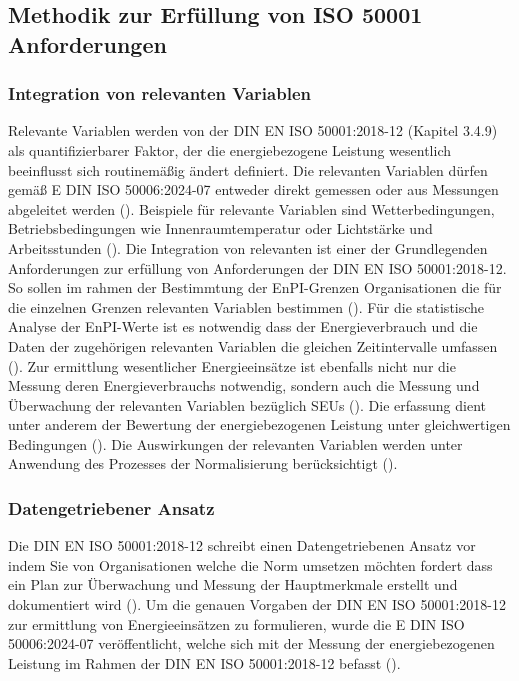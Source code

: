 \subsection{Methodik zur Erfüllung von ISO 50001 Anforderungen}

\subsubsection{Integration von relevanten Variablen}
Relevante Variablen werden von der DIN EN ISO 50001:2018-12 (Kapitel 3.4.9) als quantifizierbarer Faktor, der die energiebezogene Leistung wesentlich beeinflusst sich 
routinemäßig ändert definiert. 
Die relevanten Variablen dürfen gemäß E DIN ISO 50006:2024-07 entweder direkt gemessen oder aus Messungen abgeleitet werden (\cite[S. 18]{DIN50006.2024}).
Beispiele für relevante Variablen sind Wetterbedingungen, Betriebsbedingungen wie Innenraumtemperatur oder Lichtstärke und Arbeitsstunden (\cite[Kapitel 3.4.9]{DIN50001.2018}).
Die Integration von relevanten ist einer der Grundlegenden Anforderungen zur erfüllung von Anforderungen der DIN EN ISO 50001:2018-12.
So sollen im rahmen der Bestimmtung der EnPI-Grenzen Organisationen die für die einzelnen Grenzen relevanten Variablen bestimmen (\cite[S. 17]{DIN50006.2024}).
Für die statistische Analyse der EnPI-Werte ist es notwendig dass der Energieverbrauch und die Daten der zugehörigen relevanten Variablen 
die gleichen Zeitintervalle umfassen (\cite[S. 20]{DIN50006.2024}).
Zur ermittlung wesentlicher Energieeinsätze ist ebenfalls nicht nur die Messung deren Energieverbrauchs notwendig, sondern auch die Messung und Überwachung der 
relevanten Variablen bezüglich SEUs (\cite[S. 23]{DIN50001.2018}). 
Die erfassung dient unter anderem der Bewertung der energiebezogenen Leistung unter gleichwertigen Bedingungen (\cite[S. 8]{DIN50006.2024}). 
Die Auswirkungen der relevanten Variablen werden unter Anwendung des Prozesses der Normalisierung berücksichtigt (\cite[S. 8]{DIN50006.2024}).

\subsubsection{Datengetriebener Ansatz}

Die DIN EN ISO 50001:2018-12 schreibt einen Datengetriebenen Ansatz vor indem Sie von Organisationen welche die Norm umsetzen möchten fordert dass ein Plan zur 
Überwachung und Messung der Hauptmerkmale erstellt und dokumentiert wird (\cite[S. 30ff.]{DIN50001.2018}).
Um die genauen Vorgaben der DIN EN ISO 50001:2018-12 zur ermittlung von Energieeinsätzen zu formulieren, wurde die E DIN ISO 50006:2024-07 veröffentlicht,
welche sich mit der Messung der energiebezogenen Leistung im Rahmen der DIN EN ISO 50001:2018-12 befasst (\cite[S. 1]{DIN50006.2024}).

